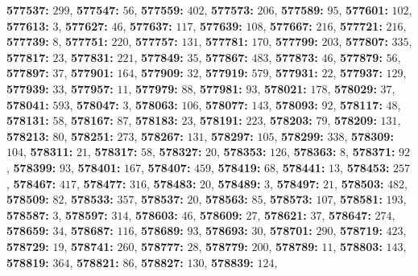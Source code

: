 \textsf{\bfseries 577537:} $299$, \textsf{\bfseries 577547:} $56$, \textsf{\bfseries 577559:} $402$, \textsf{\bfseries 577573:} $206$, \textsf{\bfseries 577589:} $95$, \textsf{\bfseries 577601:} $102$, \textsf{\bfseries 577613:} $3$, \textsf{\bfseries 577627:} $46$, \textsf{\bfseries 577637:} $117$, \textsf{\bfseries 577639:} $108$, \textsf{\bfseries 577667:} $216$, \textsf{\bfseries 577721:} $216$, \textsf{\bfseries 577739:} $8$, \textsf{\bfseries 577751:} $220$, \textsf{\bfseries 577757:} $131$, \textsf{\bfseries 577781:} $170$, \textsf{\bfseries 577799:} $203$, \textsf{\bfseries 577807:} $335$, \textsf{\bfseries 577817:} $23$, \textsf{\bfseries 577831:} $221$, \textsf{\bfseries 577849:} $35$, \textsf{\bfseries 577867:} $483$, \textsf{\bfseries 577873:} $46$, \textsf{\bfseries 577879:} $56$, \textsf{\bfseries 577897:} $37$, \textsf{\bfseries 577901:} $164$, \textsf{\bfseries 577909:} $32$, \textsf{\bfseries 577919:} $579$, \textsf{\bfseries 577931:} $22$, \textsf{\bfseries 577937:} $129$, \textsf{\bfseries 577939:} $33$, \textsf{\bfseries 577957:} $11$, \textsf{\bfseries 577979:} $88$, \textsf{\bfseries 577981:} $93$, \textsf{\bfseries 578021:} $178$, \textsf{\bfseries 578029:} $37$, \textsf{\bfseries 578041:} $593$, \textsf{\bfseries 578047:} $3$, \textsf{\bfseries 578063:} $106$, \textsf{\bfseries 578077:} $143$, \textsf{\bfseries 578093:} $92$, \textsf{\bfseries 578117:} $48$, \textsf{\bfseries 578131:} $58$, \textsf{\bfseries 578167:} $87$, \textsf{\bfseries 578183:} $23$, \textsf{\bfseries 578191:} $223$, \textsf{\bfseries 578203:} $79$, \textsf{\bfseries 578209:} $131$, \textsf{\bfseries 578213:} $80$, \textsf{\bfseries 578251:} $273$, \textsf{\bfseries 578267:} $131$, \textsf{\bfseries 578297:} $105$, \textsf{\bfseries 578299:} $338$, \textsf{\bfseries 578309:} $104$, \textsf{\bfseries 578311:} $21$, \textsf{\bfseries 578317:} $58$, \textsf{\bfseries 578327:} $20$, \textsf{\bfseries 578353:} $126$, \textsf{\bfseries 578363:} $8$, \textsf{\bfseries 578371:} $92$, \textsf{\bfseries 578399:} $93$, \textsf{\bfseries 578401:} $167$, \textsf{\bfseries 578407:} $459$, \textsf{\bfseries 578419:} $68$, \textsf{\bfseries 578441:} $13$, \textsf{\bfseries 578453:} $257$, \textsf{\bfseries 578467:} $417$, \textsf{\bfseries 578477:} $316$, \textsf{\bfseries 578483:} $20$, \textsf{\bfseries 578489:} $3$, \textsf{\bfseries 578497:} $21$, \textsf{\bfseries 578503:} $482$, \textsf{\bfseries 578509:} $82$, \textsf{\bfseries 578533:} $357$, \textsf{\bfseries 578537:} $20$, \textsf{\bfseries 578563:} $85$, \textsf{\bfseries 578573:} $107$, \textsf{\bfseries 578581:} $193$, \textsf{\bfseries 578587:} $3$, \textsf{\bfseries 578597:} $314$, \textsf{\bfseries 578603:} $46$, \textsf{\bfseries 578609:} $27$, \textsf{\bfseries 578621:} $37$, \textsf{\bfseries 578647:} $274$, \textsf{\bfseries 578659:} $34$, \textsf{\bfseries 578687:} $116$, \textsf{\bfseries 578689:} $93$, \textsf{\bfseries 578693:} $30$, \textsf{\bfseries 578701:} $290$, \textsf{\bfseries 578719:} $423$, \textsf{\bfseries 578729:} $19$, \textsf{\bfseries 578741:} $260$, \textsf{\bfseries 578777:} $28$, \textsf{\bfseries 578779:} $200$, \textsf{\bfseries 578789:} $11$, \textsf{\bfseries 578803:} $143$, \textsf{\bfseries 578819:} $364$, \textsf{\bfseries 578821:} $86$, \textsf{\bfseries 578827:} $130$, \textsf{\bfseries 578839:} $124$, 
